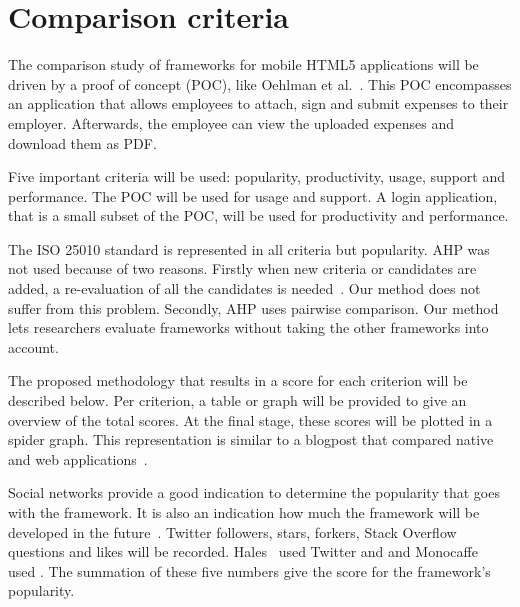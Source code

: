 \documentclass[a4paper]{artikel3}
\newcommand{\setspace}[0]{\vspace{2mm}}
\renewcommand{\paragraph}[1]{\setspace \noindent {\bf #1}  }
\begin{document}

\section{Comparison criteria} %
\label{sec:comparisoncriteria}

The comparison study of frameworks for mobile HTML5 applications will be driven by a proof of concept (POC), like Oehlman et al.~\cite{Oeflman2011}.
This POC encompasses an application that allows employees to attach, sign and submit expenses to their employer.
Afterwards, the employee can view the uploaded expenses and download them as PDF.

Five important criteria will be used:  popularity,  productivity,  usage,  support and performance. 
The POC will be used for usage and support.   
A login application, that is a small subset of the POC, will be used for productivity and performance.
 
The ISO 25010 standard is represented in all criteria but popularity.
AHP was not used because of two reasons.
Firstly when new criteria or candidates are added, a re-evaluation of all the candidates is needed~\cite{Jadhav2009}. 
Our method does not suffer from this problem.
Secondly, AHP uses pairwise comparison.
Our method lets researchers evaluate frameworks without taking the other frameworks into account. 

The proposed methodology that results in a score for each criterion will be described below.  
Per criterion,  a table or graph will be provided to give an overview of the total scores.
At the final stage, these scores will be plotted in a spider graph.
This representation is similar to a blogpost that compared native and web applications~\cite{Jeroen2012}.   

\paragraph{Popularity}
Social networks provide a good indication to determine the popularity that goes with the framework.  
It is also an indication how much the framework will be developed in the future~\cite{Sarrafi2012a}.
Twitter followers,  \gh{} stars,  \gh{} forkers,  Stack Overflow questions and \fb{} likes will be recorded.
Hales~\cite{Hales2012} used Twitter and \gh{} and Monocaffe~\cite{Ayuso2012} used \so{}.
The summation of these five numbers give the score for the framework's popularity.  
\end{document}
